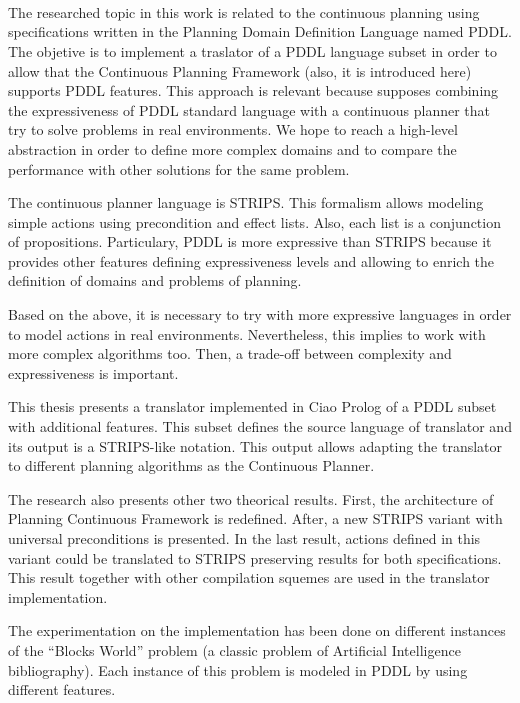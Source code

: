 \ \\
\ \\
\label{pagsumm}
\\
\ \\
\ \\

\ \\

\ \\
\ \\

The researched topic in this work is related to the continuous
planning using specifications written in the Planning Domain Definition
Language named PDDL. 
The objetive is to implement a traslator of a PDDL language subset 
in order to allow that the Continuous Planning Framework (also, it is introduced
here) supports PDDL features. This approach is relevant because 
supposes combining the expressiveness of PDDL standard language with a
continuous planner that try to solve problems in real environments.  
We hope to reach a high-level abstraction in order to define more
complex domains and to compare the performance with other solutions for the
same problem.

The continuous planner language is STRIPS. This formalism allows
modeling simple actions using precondition and effect lists. Also,
each list is a conjunction of propositions. Particulary, PDDL is more 
expressive than STRIPS because it provides other features defining
expressiveness levels and allowing to enrich the definition of domains and
problems of planning.

Based on the above, it is necessary to try with more expressive languages in order to model
actions in real environments. Nevertheless, this implies to work with
more complex algorithms too. Then, a trade-off between
complexity and expressiveness is important.
 
This thesis presents a translator implemented in Ciao Prolog of a 
PDDL subset with a\-ddi\-tio\-nal features. This subset defines the
source language of translator and its output is a
STRIPS-like notation. This output allows adapting the translator to different planning 
algorithms as the Continuous Planner. 

The research also presents other two theorical results. First, the
architecture of Planning Continuous Framework is redefined. After, a
new STRIPS variant with universal preconditions is presented. In the
last result, actions defined in this variant could be translated to
STRIPS preserving results for both specifications. This result
together with other compilation squemes are used in the translator
implementation.

The experimentation on the implementation has been done on different 
instances of the ``Blocks World'' problem (a classic problem of
Artificial Intelligence bibliography). Each instance of this problem is modeled in PDDL by using
different features. 

\vfill
\pagebreak

